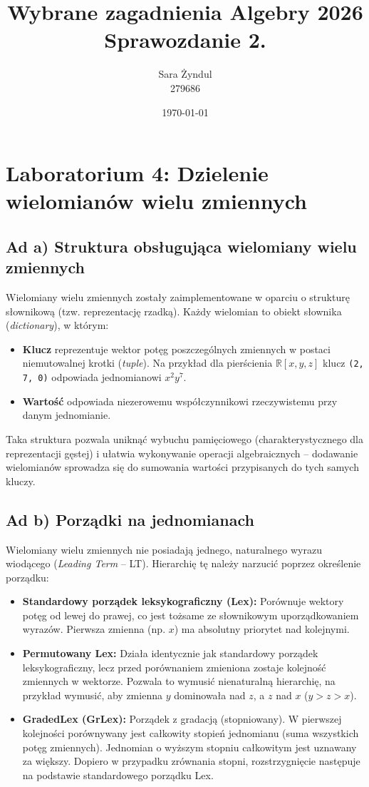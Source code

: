 \documentclass[a4paper,11pt]{article}
\title{Wybrane zagadnienia Algebry 2026\\Sprawozdanie 2.}
\author{Sara Żyndul \\ 279686}
\date{\today}
\begin{document}
\maketitle

\section{Laboratorium 4: Dzielenie wielomianów wielu zmiennych}

\subsection{Ad a) Struktura obsługująca wielomiany wielu zmiennych}
Wielomiany wielu zmiennych zostały zaimplementowane w oparciu o strukturę słownikową (tzw. reprezentację rzadką). Każdy wielomian to obiekt słownika (\textit{dictionary}), w którym:
\begin{itemize}
    \item \textbf{Klucz} reprezentuje wektor potęg poszczególnych zmiennych w postaci niemutowalnej krotki (\textit{tuple}). Na przykład dla pierścienia $\mathbb{R}[x,y,z]$ klucz \texttt{(2, 7, 0)} odpowiada jednomianowi $x^2y^7$.
    \item \textbf{Wartość} odpowiada niezerowemu współczynnikowi rzeczywistemu przy danym jednomianie.
\end{itemize}
Taka struktura pozwala uniknąć wybuchu pamięciowego (charakterystycznego dla reprezentacji gęstej) i ułatwia wykonywanie operacji algebraicznych – dodawanie wielomianów sprowadza się do sumowania wartości przypisanych do tych samych kluczy.

\subsection{Ad b) Porządki na jednomianach}
Wielomiany wielu zmiennych nie posiadają jednego, naturalnego wyrazu wiodącego (\textit{Leading Term} -- LT). Hierarchię tę należy narzucić poprzez określenie porządku:
\begin{itemize}
    \item \textbf{Standardowy porządek leksykograficzny (Lex):} Porównuje wektory potęg od lewej do prawej, co jest tożsame ze słownikowym uporządkowaniem wyrazów. Pierwsza zmienna (np. $x$) ma absolutny priorytet nad kolejnymi.
    \item \textbf{Permutowany Lex:} Działa identycznie jak standardowy porządek leksykograficzny, lecz przed porównaniem zmieniona zostaje kolejność zmiennych w wektorze. Pozwala to wymusić nienaturalną hierarchię, na przykład wymusić, aby zmienna $y$ dominowała nad $z$, a $z$ nad $x$ ($y > z > x$).
    \item \textbf{GradedLex (GrLex):} Porządek z gradacją (stopniowany). W pierwszej kolejności porównywany jest całkowity stopień jednomianu (suma wszystkich potęg zmiennych). Jednomian o wyższym stopniu całkowitym jest uznawany za większy. Dopiero w przypadku zrównania stopni, rozstrzygnięcie następuje na podstawie standardowego porządku Lex.
\end{itemize}
\end{document}
